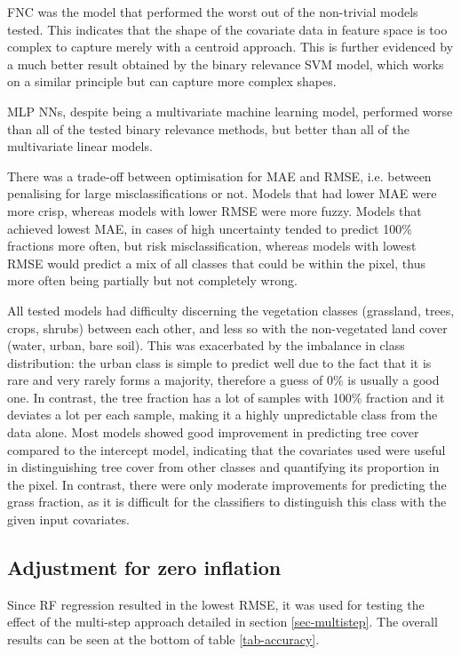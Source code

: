 \documentclass[review,authoryear,3p]{elsarticle}
\begin{document}
\Gls{FNC} was the model that performed the worst out of the non-trivial models tested.
This indicates that the shape of the covariate data in feature space is too complex to capture merely with a centroid approach.
This is further evidenced by a much better result obtained by the binary relevance \gls{SVM} model, which works on a similar principle but can capture more complex shapes.

\Gls{MLP} \glspl{NN}, despite being a multivariate machine learning model, performed worse than all of the tested binary relevance methods, but better than all of the multivariate linear models.

There was a trade-off between optimisation for \gls{MAE} and \gls{RMSE}, i.e. between penalising for large misclassifications or not.
Models that had lower \gls{MAE} were more crisp, whereas models with lower \gls{RMSE} were more fuzzy.
Models that achieved lowest \gls{MAE}, in cases of high uncertainty tended to predict 100\% fractions more often, but risk misclassification, whereas models with lowest \gls{RMSE} would predict a mix of all classes that could be within the pixel, thus more often being partially but not completely wrong.

All tested models had difficulty discerning the vegetation classes (grassland, trees, crops, shrubs) between each other, and less so with the non-vegetated land cover (water, urban, bare soil).
This was exacerbated by the imbalance in class distribution: the urban class is simple to predict well due to the fact that it is rare and very rarely forms a majority, therefore a guess of 0\% is usually a good one.
In contrast, the tree fraction has a lot of samples with 100\% fraction and it deviates a lot per each sample, making it a highly unpredictable class from the data alone.
Most models showed good improvement in predicting tree cover compared to the intercept model, indicating that the covariates used were useful in distinguishing tree cover from other classes and quantifying its proportion in the pixel.
In contrast, there were only moderate improvements for predicting the grass fraction, as it is difficult for the classifiers to distinguish this class with the given input covariates.

\subsection{Adjustment for zero inflation}

Since \gls{RF} regression resulted in the lowest RMSE, it was used for testing the effect of the multi-step approach detailed in section \ref{sec-multistep}.
The overall results can be seen at the bottom of table \ref{tab-accuracy}.
\end{document}

